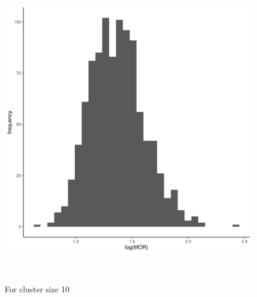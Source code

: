 \documentclass[
  letterpaper,
  DIV=11,
  numbers=noendperiod,
  titlepage]{scrartcl}
\begin{document}
\begin{figure}
\begin{minipage}[t]{0.50\linewidth}
{{\includegraphics{../../plots/two-lvl-ran-int/high-prev/hist_100_10_two_lvl_high_prev.png}

}

\caption{For cluster size 10}

}

\end{minipage}%
\newline
\begin{minipage}[t]{\linewidth}

{\centering 

~

}

\end{minipage}%
\newline
\begin{minipage}[t]{0.50\linewidth}

{\centering 

\raisebox{-\height}{

}}
\end{minipage}
\end{figure}
\end{document}
